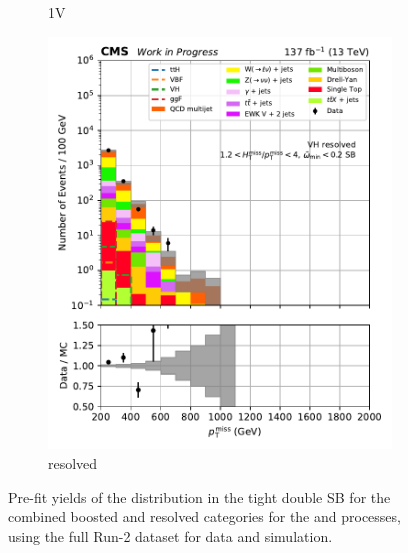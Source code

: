 \begin{figure}[htbp]
\begin{subfigure}[b]{0.24\textwidth}
        \caption{\VH 1V}
    \end{subfigure}
    \hfill
    \begin{subfigure}[b]{0.24\textwidth}
        \includegraphics[width=\textwidth]{figures/region_plots/2016to18/sideband_0/VH_resolved.pdf}
        \caption{\VH resolved}
    \end{subfigure}
    \caption[Pre-fit yields of the \ptmiss distribution in the tight double sideband for the combined boosted and resolved categories for the \ttH and \VH processes, using the full Run-2 dataset for data and simulation]{Pre-fit yields of the \ptmiss distribution in the tight double \gls{SB} for the combined boosted and resolved categories for the \ttH and \VH processes, using the full Run-2 dataset for data and simulation.}
    \label{fig:htoinv_sb_yields_comb2016to18_tight_double}
\end{figure}

